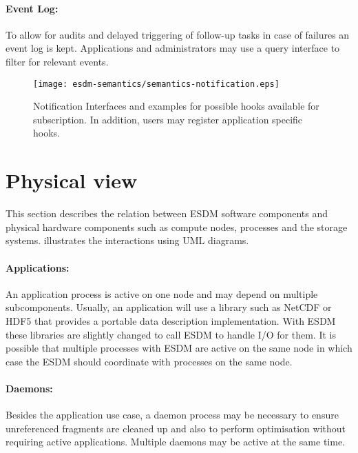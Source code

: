 \paragraph{Event Log:}
To allow for audits and delayed triggering of follow-up tasks in case of failures an event log is kept.
Applications and administrators may use a query interface to filter for relevant events.


\begin{figure}
	\centering
	\texttt{[image: esdm-semantics/semantics-notification.eps]}
	\caption{Notification Interfaces and examples for possible hooks available for subscription. In addition, users may register application specific hooks.}
	\label{fig:semantic notification}
\end{figure}









\section{Physical view}
\label{sec: viewpoints/physical}

This section describes the relation between ESDM software components and physical hardware components such as compute nodes, processes and the storage systems.
 illustrates the interactions using UML diagrams.

\paragraph{Applications:} An application process is active on one node and may depend on multiple subcomponents.
Usually, an application will use a library such as NetCDF or HDF5 that provides a portable data description implementation.
With ESDM these libraries are slightly changed to call ESDM to handle I/O for them.
It is possible that multiple processes with ESDM are active on the same node in which case the ESDM should coordinate with processes on the same node.

\paragraph{Daemons:} Besides the application use case, a daemon process may be necessary to ensure unreferenced fragments are cleaned up and also to perform optimisation without requiring active applications.
Multiple daemons may be active at the same time.



